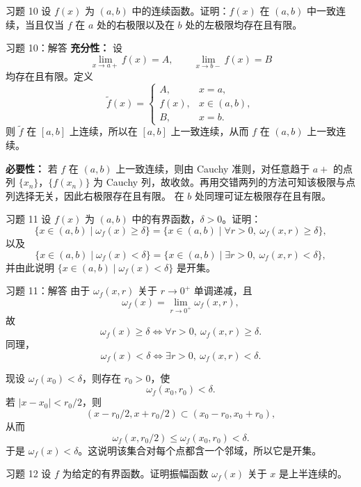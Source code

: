 ﻿\documentclass[aspectratio=169,11pt]{ctexbeamer}
\newcommand{\osc}{\omega}
\begin{document}
\begin{frame}{习题 10}
设 $f(x)$ 为 $(a,b)$ 中的连续函数。证明：$f(x)$ 在 $(a,b)$ 中一致连续，当且仅当 $f$ 在 $a$ 处的右极限以及在 $b$ 处的左极限均存在且有限。
\end{frame}

\begin{frame}{习题 10：解答}
\textbf{充分性：} 设
\[
  \lim_{x\to a+}f(x)=A,\qquad \lim_{x\to b-}f(x)=B
\]
均存在且有限。定义
\[
  \tilde f(x)=
  \begin{cases}
    A,& x=a,\\
    f(x),& x\in(a,b),\\
    B,& x=b.
  \end{cases}
\]
则 $\tilde f$ 在 $[a,b]$ 上连续，所以在 $[a,b]$ 上一致连续，从而 $f$ 在 $(a,b)$ 上一致连续。
\vspace{0.5em}

\textbf{必要性：} 若 $f$ 在 $(a,b)$ 上一致连续，则由 Cauchy 准则，对任意趋于 $a+$ 的点列 $\{x_n\}$，$\{f(x_n)\}$ 为 Cauchy 列，故收敛。再用交错两列的方法可知该极限与点列选择无关，因此右极限存在且有限。  
在 $b$ 处同理可证左极限存在且有限。
\end{frame}

\begin{frame}{习题 11}
设 $f(x)$ 为 $(a,b)$ 中的有界函数，$\delta>0$。证明：
\[
  \{x\in(a,b)\mid \osc_f(x)\ge \delta\}
  =
  \{x\in(a,b)\mid \forall r>0,\ \osc_f(x,r)\ge \delta\},
\]
以及
\[
  \{x\in(a,b)\mid \osc_f(x)< \delta\}
  =
  \{x\in(a,b)\mid \exists r>0,\ \osc_f(x,r)< \delta\},
\]
并由此说明 $\{x\in(a,b)\mid \osc_f(x)<\delta\}$ 是开集。
\end{frame}

\begin{frame}[allowframebreaks]{习题 11：解答}
由于 $\osc_f(x,r)$ 关于 $r\to 0^+$ 单调递减，且
\[
  \osc_f(x)=\lim_{r\to0^+}\osc_f(x,r),
\]
故
\[
  \osc_f(x)\ge \delta
  \Longleftrightarrow
  \forall r>0,\ \osc_f(x,r)\ge \delta.
\]
同理，
\[
  \osc_f(x)<\delta
  \Longleftrightarrow
  \exists r>0,\ \osc_f(x,r)<\delta.
\]
\vspace{0.5em}

现设 $\osc_f(x_0)<\delta$，则存在 $r_0>0$，使
\[
  \osc_f(x_0,r_0)<\delta.
\]
若 $|x-x_0|<r_0/2$，则
\[
  (x-r_0/2,x+r_0/2)\subset (x_0-r_0,x_0+r_0),
\]
从而
\[
  \osc_f(x,r_0/2)\le \osc_f(x_0,r_0)<\delta.
\]
于是 $\osc_f(x)<\delta$。这说明该集合对每个点都含一个邻域，所以它是开集。
\end{frame}

\begin{frame}{习题 12}
设 $f$ 为给定的有界函数。证明振幅函数 $\osc_f(x)$ 关于 $x$ 是上半连续的。
\end{frame}
\end{document}

